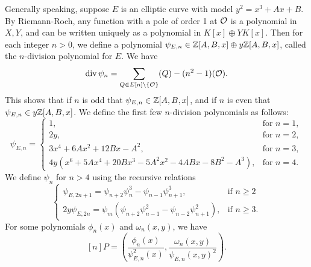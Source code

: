 Generally speaking, suppose $E$ is an elliptic curve with model $y^2= x^3 + Ax + B$. By Riemann-Roch, any function with a pole of order 1 at $\mathcal{O}$ is a polynomial in $X, Y$, and can be written uniquely as a polynomial in  $K[x] \oplus YK[x]$. Then for each integer $n > 0$, we define a polynomial $\psi_{E,n} \in \mathbb{Z}[A,B,x] \oplus y \mathbb{Z}[A,B,x]$, called the $n$-division polynomial for $E$. We have
	\[
	\operatorname{div} \psi_n= \sum_{Q \in E[n] \setminus \{\mathcal{O}\}} (Q) - (n^2 - 1)(\mathcal{O}).
	\]
This shows that if $n$ is odd that $\psi_{E,n} \in \mathbb{Z}[A,B,x]$, and if $n$ is even that $\psi_{E,n} \in y\mathbb{Z}[A,B,x]$. We define the first few $n$-division polynomials as follows:
	\[
	\psi_{E,n}= 
	\begin{cases}
	1, & \text{for } n= 1, \\
	2y, & \text{for } n= 2, \\
	3x^4 + 6Ax^2 + 12Bx - A^2, & \text{for } n= 3, \\
	4y(x^6 + 5Ax^4 + 20Bx^3 - 5A^2x^2 - 4ABx - 8B^2 - A^3), & \text{for } n= 4.
	\end{cases}
	\]
We define $\psi_n$ for $n > 4$ using the recursive relations 
	\[
	\begin{cases}
	\psi_{E,{2n+1}}= \psi_{n+2} \psi_n^3 - \psi_{n-1} \psi_{n+1}^3, & \text{if } n \geq 2 \\
	2y\psi_{E,2n}= \psi_m (\psi_{n+2} \psi_{n-1}^2 - \psi_{n-2} \psi_{n+1}^2), & \text{if } n \geq 3.
	\end{cases}
	\]
For some polynomials $\phi_n(x)$ and $\omega_n(x,y)$, we have
	\[
	[n]P= \left( \dfrac{\phi_n(x)}{\psi_{E,n}^2(x)}, \dfrac{\omega_n(x,y)}{\psi_{E,n}(x,y)^2} \right). 
	\]


